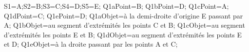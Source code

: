 \documentclass[exercice]{thedocument}%
\begin{document}
%
    \>S1=A;\>S2=B;\>S3=C;\>S4=D;\>S5=E;%
    \>Q1aPoint=B;%
    \>Q1bPoint=D;%
    \>Q1cPoint=A;%
    \>Q1dPoint=C;%
    \>Q1ePoint=D;%
    \>Q1aObjet={à la demi-droite d'origine E passant par A};%
    \>Q1bObjet={au segment d'extrémités les points C et B};%
    \>Q1cObjet={au segment d'extrémités les points E et B};%
    \>Q1dObjet={au segment d'extrémités les points E et D};%
    \>Q1eObjet={à la droite passant par les points A et C};%
\end{document}
